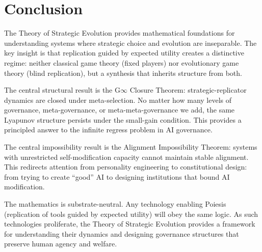 \documentclass[12pt]{article}
\begin{document}

\section{Conclusion}
\label{sec:conclusion}

The Theory of Strategic Evolution provides mathematical foundations for understanding systems where strategic choice and evolution are inseparable. The key insight is that replication guided by expected utility creates a distinctive regime: neither classical game theory (fixed players) nor evolutionary game theory (blind replication), but a synthesis that inherits structure from both.

The central structural result is the G$\infty$ Closure Theorem: strategic-replicator dynamics are closed under meta-selection. No matter how many levels of governance, meta-governance, or meta-meta-governance we add, the same Lyapunov structure persists under the small-gain condition. This provides a principled answer to the infinite regress problem in AI governance.

The central impossibility result is the Alignment Impossibility Theorem: systems with unrestricted self-modification capacity cannot maintain stable alignment. This redirects attention from personality engineering to constitutional design: from trying to create ``good'' AI to designing institutions that bound AI modification.

The mathematics is substrate-neutral. Any technology enabling Poiesis (replication of tools guided by expected utility) will obey the same logic. As such technologies proliferate, the Theory of Strategic Evolution provides a framework for understanding their dynamics and designing governance structures that preserve human agency and welfare.

\end{document}
